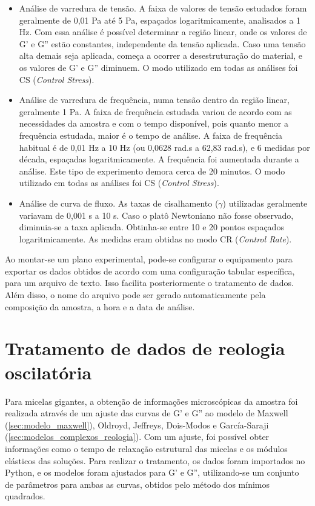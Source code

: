 		\begin{itemize}[noitemsep]
			\item Análise de varredura de tensão. A faixa de valores de tensão estudados foram geralmente de 0,01 Pa até 5 Pa, espaçados logaritmicamente, analisados a 1 Hz. Com essa análise é possível determinar a região linear, onde os valores de G' e G'' estão constantes, independente da tensão aplicada. Caso uma tensão alta demais seja aplicada, começa a ocorrer a desestruturação do material, e os valores de G' e G'' diminuem. O modo utilizado em todas as análises foi CS (\emph{Control Stress}).
			
			\item Análise de varredura de frequência, numa tensão dentro da região linear, geralmente 1 Pa. A faixa de frequência estudada variou de acordo com as necessidades da amostra e com o tempo disponível, pois quanto menor a frequência estudada, maior é o tempo de análise. A faixa de frequência habitual é de 0,01 Hz a 10 Hz (ou 0,0628 rad.s\menosUm{} a 62,83 rad.s\menosUm), e 6 medidas por década, espaçadas logaritmicamente. A frequência foi aumentada durante a análise. Este tipo de experimento demora cerca de 20 minutos. O modo utilizado em todas as análises foi CS (\emph{Control Stress}).
			
			\item Análise de curva de fluxo. As taxas de cisalhamento (\(\dot{\gamma}\)) utilizadas geralmente variavam de 0,001 s\menosUm{} a 10 s\menosUm. Caso o platô Newtoniano não fosse observado, diminuia-se a taxa aplicada. Obtinha-se entre 10 e 20 pontos espaçados logaritmicamente. As medidas eram obtidas no modo CR (\emph{Control Rate}).
		\end{itemize} 
		
		Ao montar-se um plano experimental, pode-se configurar o equipamento para exportar os dados obtidos de acordo com uma configuração tabular específica, para um arquivo de texto. Isso facilita posteriormente o tratamento de dados. Além disso, o nome do arquivo pode ser gerado automaticamente pela composição da amostra, a hora e a data de análise.
		
		\section{Tratamento de dados de reologia oscilatória}
		
		Para micelas gigantes, a obtenção de informações microscópicas da amostra foi realizada através de um ajuste das curvas de G' e G'' ao modelo de Maxwell (\autoref{sec:modelo_maxwell}), Oldroyd, Jeffreys, Dois-Modos e García-Saraji (\autoref{sec:modelos_complexos_reologia}). Com um ajuste, foi possível obter informações como o tempo de relaxação estrutural das micelas e os módulos elásticos das soluções. Para realizar o tratamento, os dados foram importados no Python, e os modelos foram ajustados para G' e G'', utilizando-se um conjunto de parâmetros para ambas as curvas, obtidos pelo método dos mínimos quadrados.
		
